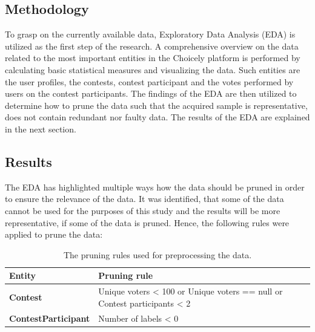 \subsection{Methodology} %
    To grasp on the currently available data, Exploratory Data Analysis (EDA) is utilized as the first step of the research. A comprehensive overview on the data related to the most important entities in the Choicely platform is performed by calculating basic statistical measures and visualizing the data. Such entities are the user profiles, the contests, contest participant and the votes performed by users on the contest participants. The findings of the EDA are then utilized to determine how to prune the data such that the acquired sample is representative, does not contain redundant nor faulty data. The results of the EDA are explained in the next section. 

    

\subsection{Results}
    The EDA has highlighted multiple ways how the data should be pruned in order to ensure the relevance of the data. It was identified, that some of the data cannot be used for the purposes of this study and the results will be more representative, if some of the data is pruned. Hence, the following rules were applied to prune the data:

    \begin {table}[]
        \centering
        \begin{tabular}{l|l}
            \textbf{Entity}              & \textbf{Pruning rule} \\
            \hline
            \textbf{Contest}             & Unique voters < 100 or Unique voters == null or Contest participants < 2 \\
            \textbf{ContestParticipant}  & Number of labels < 0 
        \end{tabular}
        \caption{The pruning rules used for preprocessing the data.}
        \label{contest_preprocessing_rules}
    \end{table}

